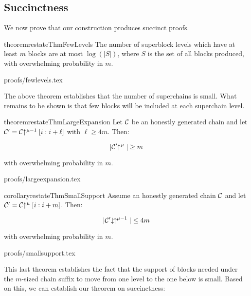 \subsection{Succinctness}

We now prove that our construction produces succinct proofs.

\begin{restatable}{theorem}{restateThmFewLevels}
    \label{thm.few-levels}
    The number of superblock levels which have at least $m$ blocks are at most
    $\log(|S|)$, where $S$ is the set of all blocks produced, with overwhelming
    probability in $m$.
\end{restatable}

\ifonecolumn
{proofs/fewlevels.tex}
\fi

The above theorem establishes that the number of superchains is small. What
remains to be shown is that few blocks will be included at each superchain
level.

\begin{restatable}{theorem}{restateThmLargeExpansion}
    \label{thm.large-expansion}
    Let $\mathcal{C}$ be an honestly generated chain and let
    $\mathcal{C}' = \mathcal{C}\negthickspace\uparrow^{\mu - 1}[i:i + \ell]$ with $\ell \geq 4m$.
    Then:

    \begin{equation}
      |\mathcal{C}'\negthickspace\uparrow^\mu| \geq m
    \end{equation}

    with overwhelming probability in $m$.
\end{restatable}

\ifonecolumn
{proofs/largeexpansion.tex}
\fi

\begin{restatable}{corollary}{restateThmSmallSupport}
    \label{crly.small-support}
    Assume an honestly generated chain $\mathcal{C}$ and let $\mathcal{C}' = \mathcal{C}\negthickspace\uparrow^\mu[i:i + m]$. Then:

    \begin{equation}
      |\mathcal{C}'\negthickspace\downarrow\,\negthickspace\uparrow^{\mu - 1}| \leq 4m
    \end{equation}

    with overwhelming probability in $m$.
\end{restatable}

\ifonecolumn
{proofs/smallsupport.tex}
\fi

This last theorem establishes the fact that the support of blocks needed under
the $m$-sized chain suffix to move from one level to the one below is small.
Based on this, we can establish our theorem on succinctness:

